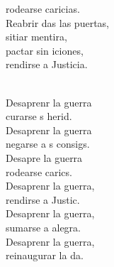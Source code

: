 \documentclass[12pt]{article}
\begin{document}
\begin{multicols*}{2}
\begin{cancion}
\begin{chorus}
	rodearse  caricias. \\
	Reabrir das las puertas, \\
	sitiar  mentira, \\
	pactar sin iciones,\\
	rendirse a  Justicia.\\
	\end{chorus}%
	\jump\\
	Desaprenr la guerra\\
	curarse s herid. \\
	Desaprenr la guerra\\
	negarse a s consigs. \\
	Desapre la guerra\\
	rodearse  carics. \\
	Desaprenr la guerra,\\
	rendirse a  Justic. \\
	Desaprenr la guerra,\\
	sumarse a  alegra. \\
	Desaprenr la guerra,\\
	reinaugurar la da. \\
\end{cancion}%


\end{multicols*}
\end{document}
